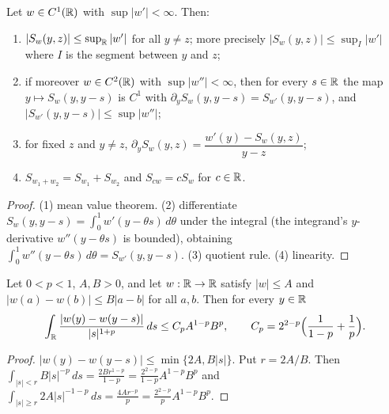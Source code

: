 \begin{lemma}
  \label{lem:c06_secant_calculus}
  Let $w\in C^1(\mathbb{R})$ with $\sup|w'|<\infty$. Then:
  \begin{enumerate}
    \item $|S_w(y,z)|\leq\sup_{\mathbb{R}}|w'|$ for all $y\neq z$; more precisely $|S_w(y,z)|\le\sup_{I}|w'|$ where $I$ is the segment between $y$ and $z$;
    \item if moreover $w\in C^2(\mathbb{R})$ with $\sup|w''|<\infty$, then for every $s\in\mathbb{R}$ the map $y\mapsto S_w(y,y-s)$ is $C^1$ with
          $\partial_yS_w(y,y-s)=S_{w'}(y,y-s)$, and $|S_{w'}(y,y-s)|\leq\sup|w''|$;
    \item for fixed $z$ and $y\neq z$, $\partial_yS_w(y,z)=\dfrac{w'(y)-S_w(y,z)}{y-z}$;
    \item $S_{w_1+w_2}=S_{w_1}+S_{w_2}$ and $S_{cw}=cS_w$ for $c\in\mathbb{R}$.
  \end{enumerate}
\end{lemma}
\begin{proof}
  (1) mean value theorem. (2) differentiate $S_w(y,y-s)=\int_0^1w'(y-\theta s)\,d\theta$ under the
  integral (the integrand's $y$-derivative $w''(y-\theta s)$ is bounded), obtaining
  $\int_0^1w''(y-\theta s)\,d\theta=S_{w'}(y,y-s)$. (3) quotient rule. (4) linearity.
\end{proof}

\begin{lemma}
  \label{lem:c06_difference_integral}
  Let $0<p<1$, $A,B>0$, and let $w:\mathbb{R}\to\mathbb{R}$ satisfy $|w|\leq A$ and $|w(a)-w(b)|\leq B|a-b|$ for all $a,b$.
  Then for every $y\in\mathbb{R}$
  \[\int_{\mathbb{R}}\frac{|w(y)-w(y-s)|}{|s|^{1+p}}\,ds\leq C_pA^{1-p}B^p,\qquad C_p=2^{2-p}\Bigl(\frac1{1-p}+\frac1p\Bigr).\]
\end{lemma}
\begin{proof}
  $|w(y)-w(y-s)|\leq\min\{2A,B|s|\}$. Put $r=2A/B$. Then
  $\int_{|s|<r}B|s|^{-p}\,ds=\frac{2B r^{1-p}}{1-p}=\frac{2^{2-p}}{1-p}A^{1-p}B^p$ and
  $\int_{|s|\geq r}2A|s|^{-1-p}\,ds=\frac{4Ar^{-p}}{p}=\frac{2^{2-p}}{p}A^{1-p}B^p$.
\end{proof}

